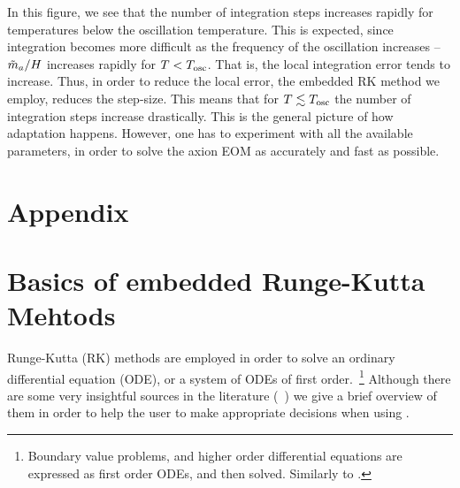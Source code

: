 \documentclass[11pt,a4paper]{article}
\renewcommand{\theequation}{\arabic{section}.\arabic{equation}}
\begin{document}
%
In this figure, we see that the number of integration steps increases rapidly for temperatures below the oscillation temperature. 
%
This is expected, since integration becomes more difficult as the frequency of the oscillation increases -- $\tilde m_{a}{}/H$ increases rapidly for $T<T_{\rm osc}{}$. That is, the local integration error tends to increase. Thus, in order to reduce the local error, the embedded RK method we employ, reduces the step-size. This means that for $T \lesssim T_{\rm osc}{}$ the number of integration steps increase drastically.
%
This is the general picture of how adaptation happens. However, one has to experiment with all the available parameters, in order to solve the axion EOM as accurately and fast as possible.  



\pagebreak
\setcounter{section}{0}
\section*{Appendix}
\appendix

\renewcommand{\theequation}{\Alph{section}.\arabic{equation}}
\setcounter{equation}{0}  %

\section{Basics of embedded Runge-Kutta Mehtods}\label{app:RK}
\setcounter{equation}{0}
%
Runge-Kutta (RK) methods are employed in order to solve an ordinary differential equation (ODE), or a system of ODEs of first order.~\footnote{Boundary value problems, and higher order differential equations are expressed as first order ODEs, and then solved. Similarly to  .}   Although there are some very insightful sources in the literature (\eg~\cite{Hairer,hairer2010solving,10.5555/1403886}) we give a brief overview of them in order to help the user to make appropriate decisions when using \mimes.
\end{document}
